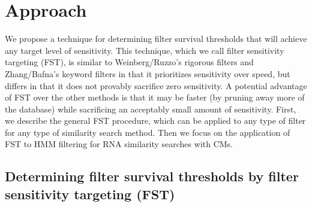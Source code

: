 \section{Approach}

We propose a technique for determining filter survival thresholds that
will achieve any target level of sensitivity. This technique, which we
call filter sensitivity targeting (FST), is similar to
Weinberg/Ruzzo's rigorous filters and Zhang/Bafna's keyword filters in
that it prioritizes sensitivity over speed, but differs in that it
does not provably sacrifice zero sensitivity. A potential advantage
of FST over the other methods is that it may be faster (by pruning away
more of the database) while sacrificing an acceptably small amount of
sensitivity.  
First, we describe the general FST procedure, which can be applied to
any type of filter for any type of similarity search method. Then we
focus on the application of FST to HMM filtering for RNA similarity
searches with CMs.

\begin{comment}
We propose a new filtering strategy that prioritizes sensitivity over
speed, but does not provably sacrifice zero sensitivity like
Weinberg/Ruzzo rigorous filters or Zhang/Bafna keyword filters.
Instead, our method, which we call filter sensitivity targeting (FST),
determines filter thresholds that will theoretically achieve a
pre-defined target level of sensitivity with the filter. FST is a
general procedure that can be applied to any type of filter for any
type of similarity search method, but here we focus on HMM filtering
for CM searches for structural RNAs.
\end{comment}


\subsection{Determining filter survival thresholds by filter sensitivity
  targeting (FST)} 

